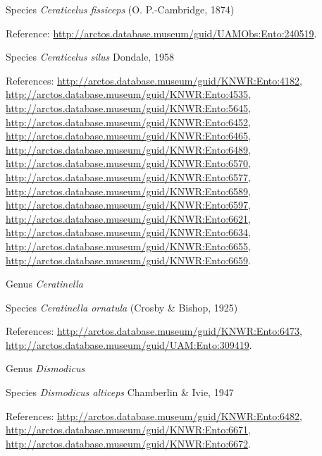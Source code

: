 \documentclass[9pt, article]{memoir}
\begin{document}
\begin{multicols}{2}
\vspace{6pt}\noindent\hspace{36pt}Species \textit{Ceraticelus fissiceps} (O. P.-Cambridge, 1874)


\vspace{6pt}Reference: 
\url{http://arctos.database.museum/guid/UAMObs:Ento:240519}.

\vspace{6pt}\noindent\hspace{36pt}Species \textit{Ceraticelus silus} Dondale, 1958


\vspace{6pt}References: 
\url{http://arctos.database.museum/guid/KNWR:Ento:4182}, 
\url{http://arctos.database.museum/guid/KNWR:Ento:4535}, 
\url{http://arctos.database.museum/guid/KNWR:Ento:5645}, 
\url{http://arctos.database.museum/guid/KNWR:Ento:6452}, 
\url{http://arctos.database.museum/guid/KNWR:Ento:6465}, 
\url{http://arctos.database.museum/guid/KNWR:Ento:6489}, 
\url{http://arctos.database.museum/guid/KNWR:Ento:6570}, 
\url{http://arctos.database.museum/guid/KNWR:Ento:6577}, 
\url{http://arctos.database.museum/guid/KNWR:Ento:6589}, 
\url{http://arctos.database.museum/guid/KNWR:Ento:6597}, 
\url{http://arctos.database.museum/guid/KNWR:Ento:6621}, 
\url{http://arctos.database.museum/guid/KNWR:Ento:6634}, 
\url{http://arctos.database.museum/guid/KNWR:Ento:6655}, 
\url{http://arctos.database.museum/guid/KNWR:Ento:6659}.

\vspace{6pt}\noindent\hspace{30pt}Genus \textit{Ceratinella}


\vspace{6pt}\noindent\hspace{36pt}Species \textit{Ceratinella ornatula} (Crosby \& Bishop, 1925)


\vspace{6pt}References: 
\url{http://arctos.database.museum/guid/KNWR:Ento:6473}, 
\url{http://arctos.database.museum/guid/UAM:Ento:309419}.

\vspace{6pt}\noindent\hspace{30pt}Genus \textit{Dismodicus}


\vspace{6pt}\noindent\hspace{36pt}Species \textit{Dismodicus alticeps} Chamberlin \& Ivie, 1947


\vspace{6pt}References: 
\url{http://arctos.database.museum/guid/KNWR:Ento:6482}, 
\url{http://arctos.database.museum/guid/KNWR:Ento:6671}, 
\url{http://arctos.database.museum/guid/KNWR:Ento:6672}.


\end{multicols}
\end{document}
